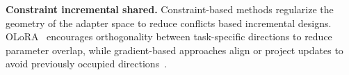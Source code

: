 \documentclass{article}
\theoremstyle{plain}
\theoremstyle{definition}
\theoremstyle{remark}
\begin{document}
\textbf{Constraint incremental shared.}
Constraint-based methods regularize the geometry of the adapter space to reduce conflicts based incremental designs. OLoRA~\citep{wang2023orthogonal} encourages orthogonality between task-specific directions to reduce parameter overlap, while gradient-based approaches align or project updates to avoid previously occupied directions~\citep{Liang_2024_CVPR,yang2024parametercollisionhinderingcontinual}.







    
\end{document}
